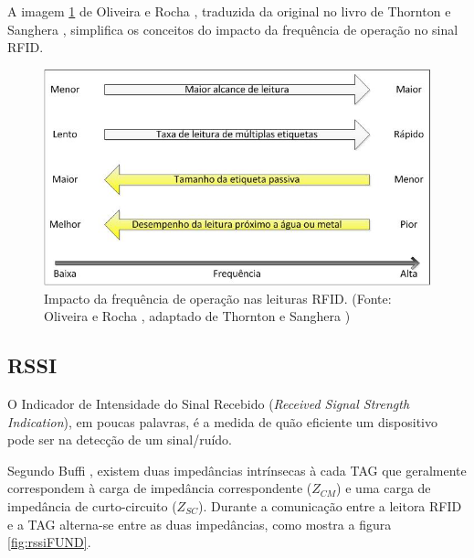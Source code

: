 A imagem \ref{fig:impactoFrec} de Oliveira e Rocha \cite{TG2013OliveiraERocha}, traduzida da original no livro de Thornton e Sanghera \cite{thornton2011cheat}, simplifica os conceitos do impacto da frequência de operação no sinal RFID.

\begin{figure}[H]
    \centering
    \includegraphics[width=0.8\linewidth]{figs/Fundamentos/frequencia.png}
    \caption{Impacto da frequência de operação nas leituras RFID. (Fonte: Oliveira e Rocha \cite{TG2013OliveiraERocha}, adaptado de Thornton e Sanghera \cite{thornton2011cheat})}
    \label{fig:impactoFrec}
\end{figure}

\subsection{RSSI}

O Indicador de Intensidade do Sinal Recebido (\textit{Received Signal Strength Indication}), em poucas palavras, é a medida de quão eficiente um dispositivo pode ser na detecção de um sinal/ruído.

Segundo Buffi \cite{buffi2018rssi}, existem duas impedâncias intrínsecas à cada TAG que geralmente correspondem à carga de impedância correspondente ($Z_{CM}$) e uma carga de impedância de curto-circuito ($Z_{SC}$). Durante a comunicação entre a leitora RFID e a TAG alterna-se entre as duas impedâncias, como mostra a figura \ref{fig:rssiFUND}.

